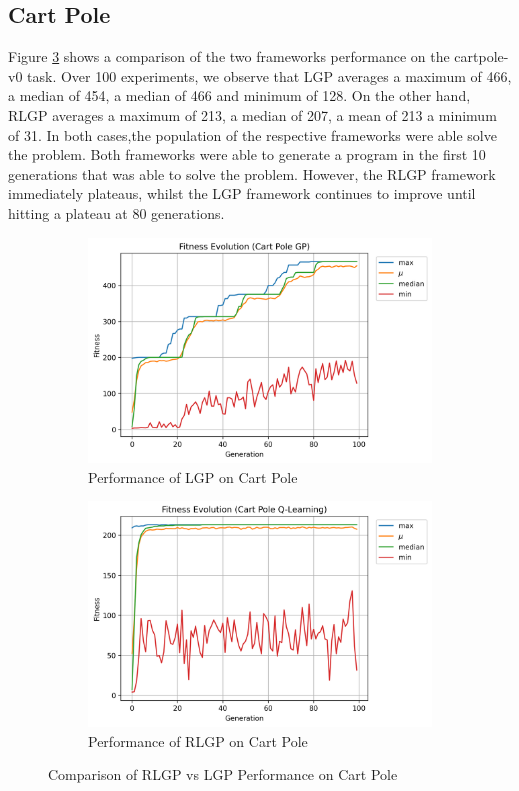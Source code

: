 \documentclass[12pt, final]{dalcsthesis}
\begin{document}
\subsection{Cart Pole}

Figure \ref{fig:cart-pole-comparison} shows a comparison of the two frameworks performance on the cartpole-v0 task. Over 100 experiments, we observe that LGP averages a maximum of 466, a median of 454, a median of 466 and minimum of 128. On the other hand, RLGP
averages a maximum of 213, a median of 207, a mean of 213 a minimum of 31. In both cases,the population of the respective frameworks were able solve the problem. Both frameworks were able
to generate a program in the first 10 generations that was able to solve the problem. However, the RLGP framework immediately plateaus, whilst the LGP framework continues to improve until hitting a plateau at 80 generations.

\begin{figure}[b]
	\centering
	\begin{subfigure}{1.0\textwidth}
		\includegraphics[width=\linewidth]{cart_pole_lgp.png}
		\caption{Performance of LGP on Cart Pole}
		\label{fig:cart-pole-lgp}
	\end{subfigure}
	\hfill
	\begin{subfigure}{1.0\textwidth}
		\includegraphics[width=\linewidth]{cart_pole_q.png}
		\caption{Performance of RLGP on Cart Pole}
		\label{fig:cart-pole-q}
	\end{subfigure}
	\caption{Comparison of RLGP vs LGP Performance on Cart Pole}
	\label{fig:cart-pole-comparison}
\end{figure}
\end{document}

